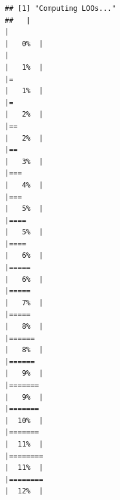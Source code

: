 \documentclass[
]{article}
\begin{document}
\begin{verbatim}
## [1] "Computing LOOs..."
##   |                                                                              |                                                                      |   0%  |                                                                              |                                                                      |   1%  |                                                                              |=                                                                     |   1%  |                                                                              |=                                                                     |   2%  |                                                                              |==                                                                    |   2%  |                                                                              |==                                                                    |   3%  |                                                                              |===                                                                   |   4%  |                                                                              |===                                                                   |   5%  |                                                                              |====                                                                  |   5%  |                                                                              |====                                                                  |   6%  |                                                                              |=====                                                                 |   6%  |                                                                              |=====                                                                 |   7%  |                                                                              |=====                                                                 |   8%  |                                                                              |======                                                                |   8%  |                                                                              |======                                                                |   9%  |                                                                              |=======                                                               |   9%  |                                                                              |=======                                                               |  10%  |                                                                              |=======                                                               |  11%  |                                                                              |========                                                              |  11%  |                                                                              |========                                                              |  12%  |                                                              
\end{verbatim}
\end{document}

